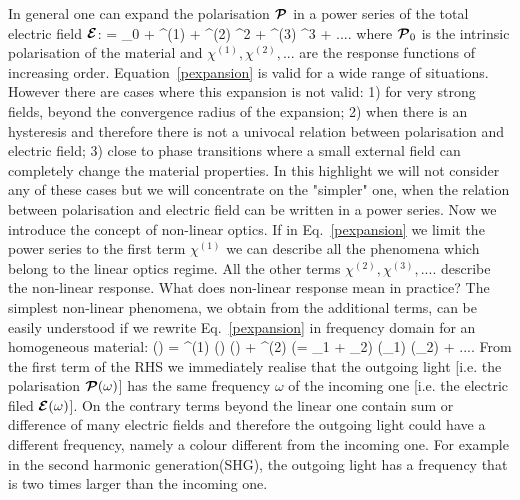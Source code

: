 In general one can expand the polarisation  ${\boldsymbol {\cal P}}$ in a power series of the total electric field ${\boldsymbol {\cal E}}$: 
\be
\PPc = \PPc_0 + \chi^{(1)} \EEc + \chi^{(2)} \EEc^2 + \chi^{(3)} \EEc^3 + ....
\label{pexpansion}
\ee
where ${\boldsymbol {\cal P}}_0$ is the intrinsic polarisation of the material and  $\chi^{(1)}, \chi^{(2)},...$ are the response functions of increasing order. Equation~\ref{pexpansion} is valid for a wide range of situations. However there are cases where this expansion is not valid: 1) for very strong fields, beyond the convergence radius of the expansion\cite{lee2014first}; 2) when there is an hysteresis and therefore there is not a univocal relation between polarisation and electric field; 3) close to phase transitions where a small external field can completely change the material properties. In this highlight we will not consider any of these cases but we will concentrate on the "simpler" one, when the relation between polarisation and electric field can be written in a power series. 
Now we introduce the concept of non-linear optics. If in Eq.~\ref{pexpansion} we limit the power series to the first term $\chi^{(1)}$ we can describe all the phenomena which belong to the linear optics regime. All the other terms  $\chi^{(2)}, \chi^{(3)},.... $  describe the non-linear response. What does non-linear response mean in practice?  The simplest non-linear phenomena, we obtain from the additional terms,  can be easily understood if we rewrite Eq.~\ref{pexpansion} in frequency domain for an homogeneous material:
\be
\PPc(\omega) = \chi^{(1)} (\omega) \EEc(\omega)  + \chi^{(2)} (\omega = \omega_1 + \omega_2) \EEc(\omega_1) \EEc(\omega_2) + ....
\label{pexpomega}
\ee
From the first term of the RHS we immediately realise that the outgoing light [i.e. the polarisation ${\boldsymbol {\cal P}} (\omega)$] has the same frequency $\omega$ of the incoming one [i.e. the electric filed ${\boldsymbol {\cal E}} (\omega)$]. On the contrary terms beyond the linear one contain sum or difference of many electric fields and therefore the outgoing light could have a different frequency, namely a colour different from the incoming one.  For example in the second harmonic generation(SHG), the outgoing light has a frequency that is two times larger than the incoming one. \\
